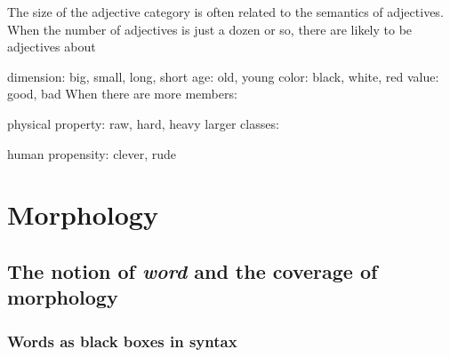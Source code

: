 \documentclass[UTF8, a4paper, oneside, scheme=plain]{ctexart}
\newcommand*{\term}[1]{\emph{#1}}
\begin{document}
The size of the adjective category is often related to the semantics of adjectives. When the number of adjectives is just a dozen or so, there are likely to be adjectives about

dimension: big, small, long, short
age: old, young
color: black, white, red
value: good, bad
When there are more members:

physical property: raw, hard, heavy
larger classes:

human propensity: clever, rude

\section{Morphology}

\subsection{The notion of \term{word} and the coverage of morphology}\label{sec:what-is-word}

\subsubsection{Words as black boxes in syntax}\label{sec:word-black-box}
\end{document}
